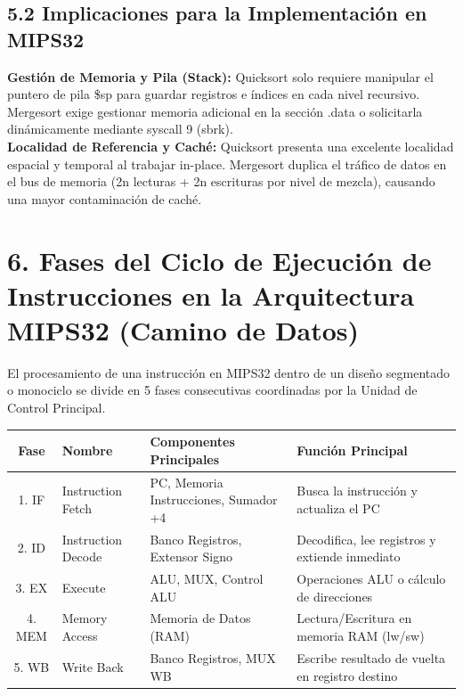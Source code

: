 \documentclass[12pt,a4paper]{article}
\begin{document}
\subsection*{5.2 Implicaciones para la Implementación en MIPS32}
\textbf{Gestión de Memoria y Pila (Stack):} Quicksort solo requiere manipular el puntero de pila \$sp para guardar registros e índices en cada nivel recursivo. Mergesort exige gestionar memoria adicional en la sección .data o solicitarla dinámicamente mediante syscall 9 (sbrk).\\
\textbf{Localidad de Referencia y Caché:} Quicksort presenta una excelente localidad espacial y temporal al trabajar in-place. Mergesort duplica el tráfico de datos en el bus de memoria (2n lecturas + 2n escrituras por nivel de mezcla), causando una mayor contaminación de caché.

\section*{6. Fases del Ciclo de Ejecución de Instrucciones en la Arquitectura MIPS32 (Camino de Datos)}
El procesamiento de una instrucción en MIPS32 dentro de un diseño segmentado o monociclo se divide en 5 fases consecutivas coordinadas por la Unidad de Control Principal.

\begin{table}[h!]
\centering
\begin{tabular}{|c|p{3.5cm}|p{4.5cm}|p{4.5cm}|}
\hline
\textbf{Fase} & \textbf{Nombre} & \textbf{Componentes Principales} & \textbf{Función Principal} \\ \hline
1. IF & Instruction Fetch & PC, Memoria Instrucciones, Sumador +4 & Busca la instrucción y actualiza el PC \\ \hline
2. ID & Instruction Decode & Banco Registros, Extensor Signo & Decodifica, lee registros y extiende inmediato \\ \hline
3. EX & Execute & ALU, MUX, Control ALU & Operaciones ALU o cálculo de direcciones \\ \hline
4. MEM & Memory Access & Memoria de Datos (RAM) & Lectura/Escritura en memoria RAM (lw/sw) \\ \hline
5. WB & Write Back & Banco Registros, MUX WB & Escribe resultado de vuelta en registro destino \\ \hline
\end{tabular}
\end{table}
\end{document}
